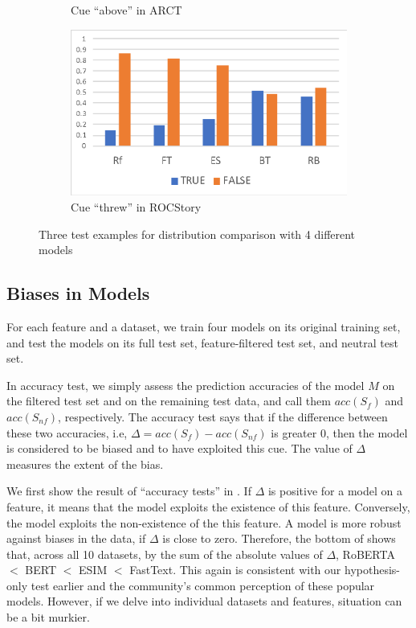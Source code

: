 \begin{figure}[th]
\begin{subfigure}[b]{0.3\textwidth}
\caption{Cue ``above'' in ARCT}
\label{fig:cue_above}
\end{subfigure}
\hfill
\begin{subfigure}[b]{0.3\textwidth}
\centering
\includegraphics[width=\columnwidth]{picture/threw_roc.eps}
\caption{Cue ``threw'' in ROCStory}
\label{fig:cue_threw}
\end{subfigure}
\caption{Three test examples for distribution comparison with 4 different models}
\label{fig:cue_result}
\end{figure}

\subsection{Biases in Models}

For each feature and a dataset, 
we train four models on its original training set,
and test the models on its full test set, feature-filtered test set, and neutral test set.   

In accuracy test, we simply assess the prediction accuracies of the model
$M$ on the filtered test set and on the remaining test data, and call them
$acc(S_f)$ and $acc(S_{nf})$, respectively. The accuracy test says that if the difference
between these two accuracies, i.e, $\Delta=acc(S_f) - acc(S_{nf})$ is greater 0, then the
model is considered to be biased and to have exploited this cue.
The value of $\Delta$ measures the extent of the bias.

We first show the result of ``accuracy tests'' in .
If $\Delta$ is positive for a model on a feature, it means that
the model exploits the existence of this feature. Conversely,
the model exploits the non-existence of the this feature.
A model is more robust against biases in the data, if $\Delta$ is
close to zero.
Therefore, the bottom of  shows that,
across all 10 datasets, by the sum of the absolute values of $\Delta$, 
RoBERTA $<$ BERT $<$ ESIM $<$ FastText. This again is consistent with
our hypothesis-only test earlier and 
the community's common perception of these popular models.
However, if we delve into individual datasets and features, 
situation can be a bit murkier.

